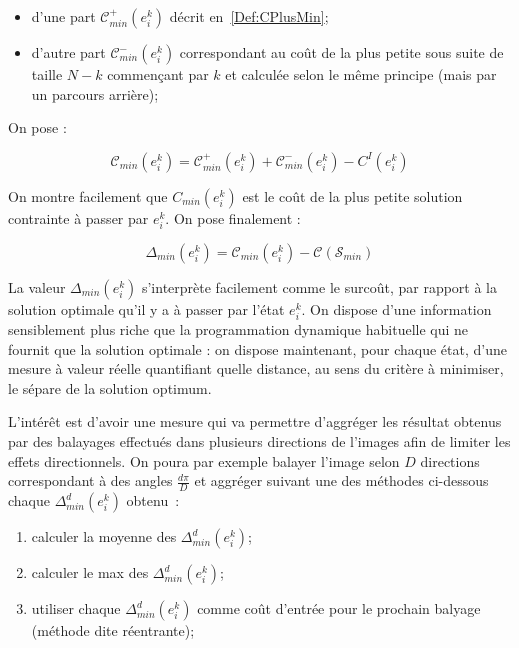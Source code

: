 {\begin{itemize}
   \item d'une part $ \mathcal C^+_{min} (e^k_i)$ d\'ecrit
    en~\ref{Def:CPlusMin};

   \item d'autre part $ \mathcal C^-_{min} (e^k_i)$ correspondant
   au co\^ut de la plus petite sous suite de
   taille $N-k$  commen\c{c}ant par $k$  et calcul\'ee selon
   le m\^eme principe  (mais par un parcours arri\`ere);
   
\end{itemize}

On pose :

\begin{equation}
  \mathcal C_{min}(e^k_i) = \mathcal C^+_{min} (e^k_i) + \mathcal C^-_{min} (e^k_i) - C^I(e^k_i)
\end{equation}

On montre facilement que $C_{min}(e^k_i)$ est le co\^ut de la plus
petite solution contrainte \`a passer par $e^k_i$.
On pose finalement :

\begin{equation}
    \Delta_{min}(e^k_i) = \mathcal C_{min}(e^k_i) -  \mathcal C ( \mathcal S_{min})
\end{equation}

La valeur $\Delta_{min}(e^k_i)$ s'interpr\`ete facilement comme 
le surco\^ut, par rapport \`a la solution optimale qu'il y a \`a passer
par l'\'etat $e^k_i$. On dispose d'une information sensiblement
plus riche que la programmation dynamique  habituelle qui ne fournit
que la solution optimale : on dispose maintenant, pour chaque \'etat,
d'une mesure \`a valeur r\'eelle quantifiant  quelle distance, au sens 
du crit\`ere \`a minimiser, le s\'epare de la solution optimum.


L'int\'er\^et est d'avoir une mesure qui va permettre d'aggr\'eger les 
r\'esultat obtenus par des balayages effectu\'es dans plusieurs
directions de l'images afin de limiter les effets directionnels.
On poura par exemple balayer l'image selon $D$ directions 
correspondant \`a des angles $\frac{d\pi}{D}$ et aggr\'eger
suivant une des m\'ethodes ci-dessous chaque $\Delta^d_{min}(e^k_i)$ obtenu~:

\begin{enumerate}
   \item calculer la moyenne des $\Delta^d_{min}(e^k_i)$;
   \item calculer le max des $\Delta^d_{min}(e^k_i)$;
   \item utiliser chaque $\Delta^d_{min}(e^k_i)$ comme co\^ut d'entr\'ee
         pour le prochain balyage (m\'ethode dite r\'eentrante);
\end{enumerate}




}
